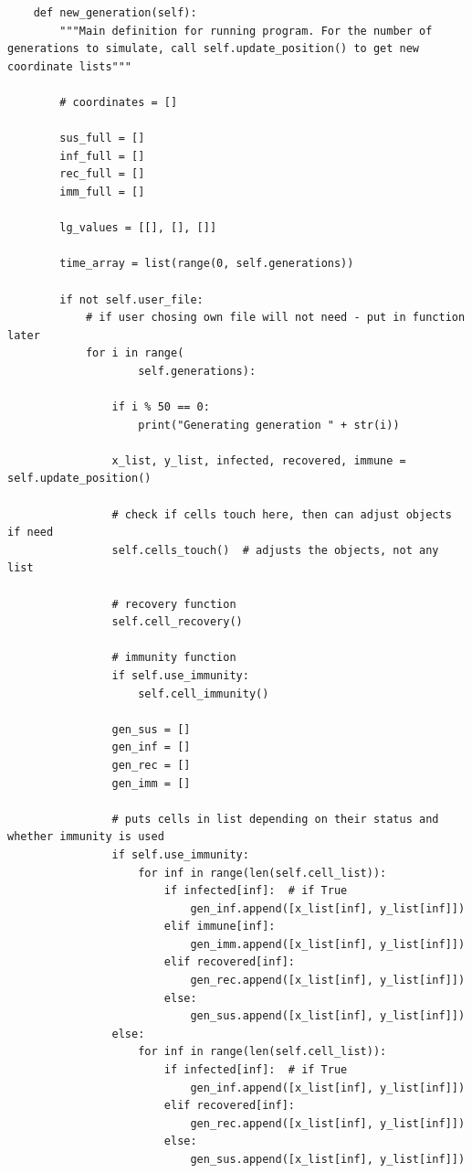 \documentclass[11pt, a4paper]{article}
\begin{document}
\begin{lstlisting}
    def new_generation(self):
        """Main definition for running program. For the number of generations to simulate, call self.update_position() to get new coordinate lists"""

        # coordinates = []

        sus_full = []
        inf_full = []
        rec_full = []
        imm_full = []

        lg_values = [[], [], []]

        time_array = list(range(0, self.generations))

        if not self.user_file:
            # if user chosing own file will not need - put in function later
            for i in range(
                    self.generations):

                if i % 50 == 0:
                    print("Generating generation " + str(i))

                x_list, y_list, infected, recovered, immune = self.update_position()

                # check if cells touch here, then can adjust objects if need
                self.cells_touch()  # adjusts the objects, not any list

                # recovery function
                self.cell_recovery()

                # immunity function
                if self.use_immunity:
                    self.cell_immunity()

                gen_sus = []
                gen_inf = []
                gen_rec = []
                gen_imm = []

                # puts cells in list depending on their status and whether immunity is used
                if self.use_immunity:
                    for inf in range(len(self.cell_list)):
                        if infected[inf]:  # if True
                            gen_inf.append([x_list[inf], y_list[inf]])
                        elif immune[inf]:
                            gen_imm.append([x_list[inf], y_list[inf]])
                        elif recovered[inf]:
                            gen_rec.append([x_list[inf], y_list[inf]])
                        else:
                            gen_sus.append([x_list[inf], y_list[inf]])
                else:
                    for inf in range(len(self.cell_list)):
                        if infected[inf]:  # if True
                            gen_inf.append([x_list[inf], y_list[inf]])
                        elif recovered[inf]:
                            gen_rec.append([x_list[inf], y_list[inf]])
                        else:
                            gen_sus.append([x_list[inf], y_list[inf]])


\end{lstlisting}
\end{document}
